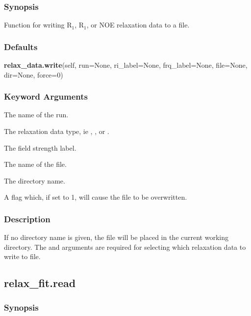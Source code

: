   
 \subsubsection{Synopsis} 

 Function for writing R$_1$, R$_1$, or NOE relaxation data to a file. 
  

  
 \subsubsection{Defaults} 

 \textsf{\textbf{relax\_data.write}(self, run=None, ri\_label=None, frq\_label=None, file=None, dir=None, force=0)} 

  
 \subsubsection{Keyword Arguments} 

   The name of the run.   

   The relaxation data type, ie , , or .   

   The field strength label.   

   The name of the file.   

   The directory name.   

   A flag which, if set to 1, will cause the file to be overwritten.  

  

  
 \subsubsection{Description} 

 If no directory name is given, the file will be placed in the current working directory. The  and  arguments are required for selecting which relaxation data to write to file. 
  

  

 \newpage 

 \subsection{relax\_fit.read} 

  
 \subsubsection{Synopsis} 

